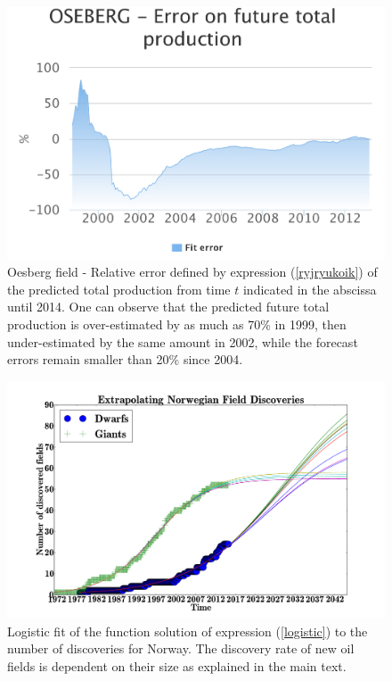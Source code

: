 \documentclass[review]{elsarticle}
\begin{document}
\noindent 
\begin{figure}[H]
\includegraphics[width=1\columnwidth]{oesberg-error}
\caption{Oesberg field - Relative error defined by expression (\ref{ryjryukoik})
of the predicted total production from time $t$ indicated in the abscissa until 2014.
One can observe that the predicted future total production is over-estimated by as much
as 70\% in 1999, then under-estimated by the same amount in 2002, while the forecast
errors remain smaller than 20\% since 2004.}
\label{oesberg-error}
\end{figure}


\begin{figure}[H]
\includegraphics[width=1\columnwidth]{extrapolating-no-discoveries}
\caption{Logistic fit of the function solution of expression (\ref{logistic})
to the number of discoveries for Norway. The discovery
rate of new oil fields is dependent on their size as explained in the main text.}
\label{rate_of_discovery} 
\end{figure}
\end{document}
